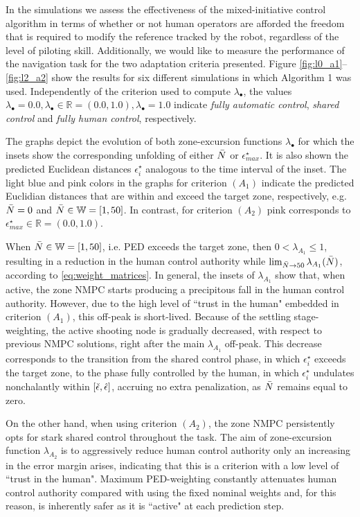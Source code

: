 In the simulations we assess the effectiveness of the mixed-initiative control algorithm in terms of whether or not human operators are afforded the freedom that is required to modify the reference tracked by the robot, regardless of the level of piloting skill. Additionally, we would like to measure the performance of the navigation task for the two adaptation criteria presented. Figure \ref{fig:l0_a1}--\ref{fig:l2_a2} show the results for six different simulations in which Algorithm 1 was used. Independently of the criterion used to compute $\lambda_{\bullet}$, the values $\lambda_{\bullet} = 0.0, \lambda_{\bullet} \in \mathbb{R} = (0.0,1.0), \lambda_{\bullet} = 1.0$ indicate \emph{fully automatic control}, \emph{shared control} and \emph{fully human control}, respectively.

The graphs depict the evolution of both zone-excursion functions $\lambda_{\bullet}$ for which the insets show the corresponding unfolding of either $\Bar{N}$ or $\epsilon^\star_{max}$. It is also shown the predicted Euclidean distances $\epsilon^\star_i$ analogous to the time interval of the inset. The light blue and pink colors in the graphs for criterion $(A_1)$ indicate the predicted Euclidian distances that are within and exceed the target zone, respectively, e.g. $\Bar{N} = 0$ and $\Bar{N} \in \mathbb{W} = [1,50]$. In contrast, for criterion $(A_2)$ pink corresponds to $\epsilon^\star_{max} \in \mathbb{R} = (0.0,1.0)$.

When $\Bar{N} \in \mathbb{W} = [1,50]$, i.e. PED exceeds the target zone, then $0 <\lambda_{A_1} \leq 1$, resulting in a reduction in the human control authority while $\lim_{\Bar{N}\to 50}\lambda_{A_1}(\Bar{N})$, according to \eqref{eq:weight_matrices}. In general, the insets of $\lambda_{A_1}$ show that, when active, the zone NMPC starts producing a precipitous fall in the human control authority. However, due to the high level of ``trust in the human" embedded in criterion $(A_1)$, this off-peak is short-lived. Because of the settling stage-weighting, the active shooting node is gradually decreased, with respect to previous NMPC solutions, right after the main $\lambda_{A_1}$ off-peak. This decrease corresponds to the transition from the shared control phase, in which $\epsilon^\star_i$ exceeds the target zone, to the phase fully controlled by the human, in which $\epsilon^\star_i$ undulates nonchalantly within $[\check{\epsilon},\Hat{\epsilon}]$, accruing no extra penalization, as $\Bar{N}$ remains equal to zero. 

On the other hand, when using criterion $(A_2)$, the zone NMPC persistently opts for stark shared control throughout the task. The aim of zone-excursion function $\lambda_{A_2}$ is to aggressively reduce human control authority only an increasing in the error margin arises, indicating that this is a criterion with a low level of ``trust in the human". Maximum PED-weighting constantly attenuates human control authority compared with using the fixed nominal weights and, for this reason, is inherently safer as it is ``active" at each prediction step.

